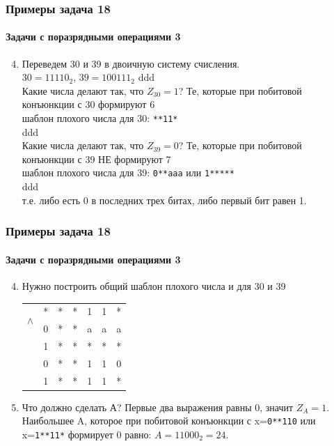 \begin{frame}[t]
\frametitle{Примеры задача 18}
\framesubtitle{Задачи с поразрядными операциями 3}

	\begin{enumerate}
	\setcounter{enumi}{3}
		\item 
		Переведем 30 и 39 в двоичную систему счисления.\\ 	\pause 
		$30=11110_2$, $39=100111_2$
		\textcolor[rgb]{1,1,1}{ddd}\\ 	\pause 
		Какие числа делают так, что $Z_{30} =1$? Те, которые при побитовой конъюнкции с 30 формируют 6\\
		шаблон плохого числа для 30: \texttt{**11*}\\
		\textcolor[rgb]{1,1,1}{ddd}\\ 	\pause 
		Какие числа делают так, что $Z_{39}=0$? Те, которые при побитовой конъюнкции с 39 НЕ формируют 7\\
		шаблон плохого числа для 39: \texttt{0**aaa} или \texttt{1*****}\\
		\textcolor[rgb]{1,1,1}{ddd}\\ 	\pause 
		т.е. либо есть 0 в последних трех битах, либо первый бит равен 1.
		
							
	\end{enumerate}
	
	
\end{frame}


\begin{frame}[t]
\frametitle{Примеры задача 18}
\framesubtitle{Задачи с поразрядными операциями 3}

	\begin{enumerate}
	\setcounter{enumi}{3}
		\item
		Нужно построить общий шаблон плохого числа и для 30 и 39\\ 	\pause 
		\begin{tabular}{ccccccc}
\multirow{2}{*}{$\wedge$}
 & * & * & * & 1 & 1 & * \tabularnewline
 & 0 & * & * & a & a & a  \tabularnewline
 & 1 & * & * & * & * & *  \tabularnewline
\cline{2-7} \cline{3-7} \cline{4-7} \cline{5-7} \cline{6-7} \cline{7-7} 
 & 0 & * & * & 1 & 1 & 0 \tabularnewline
 & 1 & * & * & 1 & 1 & * \tabularnewline
\end{tabular}
		
		
		\item Что должно сделать А? 	\pause  Первые два выражения равны 0, значит $Z_A=1$.\\ 	\pause 
		Наибольшее A, которое при побитовой конъюнкции с x=\texttt{0**110} или x=\texttt{1**11*} формирует 0 равно: $A=11000_2=24$.
					
	\end{enumerate}
	
	
\end{frame}

